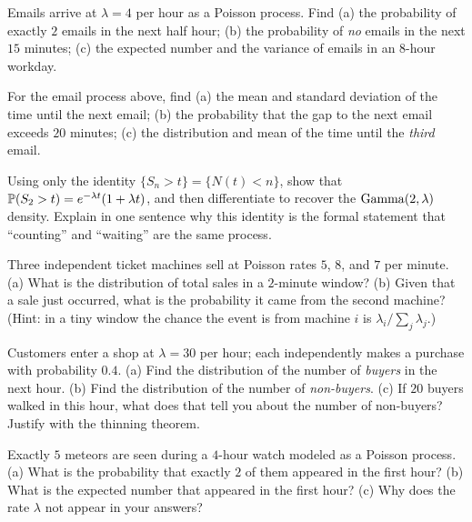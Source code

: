 \begin{exercise}
\label{ch25:exr-counts}
Emails arrive at $\lambda = 4$ per hour as a Poisson process. Find (a) the
probability of exactly $2$ emails in the next half hour; (b) the probability of
\emph{no} emails in the next $15$ minutes; (c) the expected number and the
variance of emails in an $8$-hour workday.
\end{exercise}

\begin{exercise}
\label{ch25:exr-gaps}
For the email process above, find (a) the mean and standard deviation of the time
until the next email; (b) the probability that the gap to the next email exceeds
$20$ minutes; (c) the distribution and mean of the time until the \emph{third}
email.
\end{exercise}

\begin{exercise}
\label{ch25:exr-bridge}
Using only the identity $\{S_n > t\} = \{N(t) < n\}$, show that
$\P(S_2 > t) = e^{-\lambda t}(1+\lambda t)$, and then differentiate to recover
the $\Gam(2,\lambda)$ density. Explain in one sentence why this identity is the
formal statement that ``counting'' and ``waiting'' are the same process.
\end{exercise}

\begin{exercise}
\label{ch25:exr-super}
Three independent ticket machines sell at Poisson rates $5$, $8$, and $7$ per
minute. (a) What is the distribution of total sales in a $2$-minute window? (b)
Given that a sale just occurred, what is the probability it came from the second
machine? (Hint: in a tiny window the chance the event is from machine $i$ is
$\lambda_i/\sum_j\lambda_j$.)
\end{exercise}

\begin{exercise}
\label{ch25:exr-thin}
Customers enter a shop at $\lambda = 30$ per hour; each independently makes a
purchase with probability $0.4$. (a) Find the distribution of the number of
\emph{buyers} in the next hour. (b) Find the distribution of the number of
\emph{non-buyers}. (c) If $20$ buyers walked in this hour, what does that tell you
about the number of non-buyers? Justify with the thinning theorem.
\end{exercise}

\begin{exercise}
\label{ch25:exr-uniform}
Exactly $5$ meteors are seen during a $4$-hour watch modeled as a Poisson
process. (a) What is the probability that exactly $2$ of them appeared in the
first hour? (b) What is the expected number that appeared in the first hour? (c)
Why does the rate $\lambda$ not appear in your answers?
\end{exercise}

